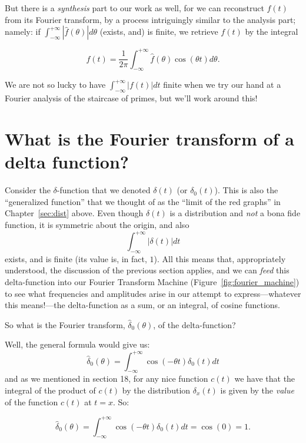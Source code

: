 \documentclass[openany]{book}
\theoremstyle{plain}
\theoremstyle{definition}
\begin{document}
{    But there is a {\it synthesis} part to our work as well,
    for we can reconstruct $f(t)$ from its Fourier transform, by a
    process intriguingly similar to the analysis part; namely:  if
$\int_{-{\infty}}^{+{\infty}}|{\hat f}(\theta)|d\theta$ (exists, and) is finite, we retrieve $f(t)$ by the integral

      $$f(t)  = {\frac{1}{2\pi}}\int_{-{\infty}}^{+{\infty}}{\hat f}(\theta)\cos(\theta t)d\theta.$$

      We are not so lucky to have
      $\int_{-{\infty}}^{+{\infty}}|f(t)|dt$ finite when we try our
      hand at a Fourier analysis of the staircase of primes, but we'll
      work around this!



\chapter[Fourier transform of delta]{What is the Fourier transform of a delta function?\label{sec:ftdelta}}

Consider the $\delta$-function that we denoted $\delta(t)$ (or
$\delta_0(t)$). This is also the ``generalized function'' that we
thought of as the ``limit of the red graphs'' in Chapter~\ref{sec:dist}
above. Even though $\delta(t)$ is a distribution and {\it not} a bona
fide function, it is symmetric about the origin, and
also $$\int_{-{\infty}}^{+{\infty}}|\delta(t)|dt$$ exists, and is
finite (its value is, in fact, $1$). All this means that,
appropriately understood, the discussion of the previous section
applies, and we can {\it feed} this delta-function into our Fourier
Transform Machine (Figure~\ref{fig:fourier_machine}) to see what
frequencies and amplitudes arise in our attempt to express---whatever
this means!---the delta-function as a sum, or an integral, of cosine
functions.


     So what is the Fourier transform,  ${\hat \delta_0}(\theta)$, of the delta-function?


Well, the general formula would give us:
  $$ {\hat \delta_0}(\theta) = \int_{-\infty}^{+\infty}\cos(-\theta t)\delta_0(t)dt$$
  and as we mentioned in section 18, for any nice function $c(t)$ we
  have that the integral of the product of $c(t)$ by the distribution
  $\delta_x(t)$ is given by the {\it value} of the function $c(t)$ at
  $t=x$.  So:

$$ {\hat \delta_0}(\theta) = \int_{-\infty}^{+\infty}\cos(-\theta t)\delta_0(t)dt = \cos(0) = 1.$$


}
\end{document}
